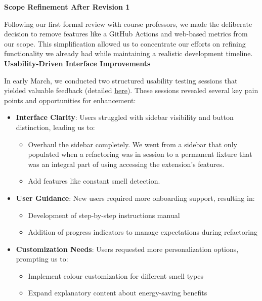 \documentclass{article}
\begin{document}
\noindent \textbf{Scope Refinement After Revision 1}

\noindent
Following our first formal review with course professors, we made the deliberate decision to remove features like a GitHub Actions and web-based metrics from our scope. This simplification allowed us to concentrate our efforts on refining functionality we already had while maintaining a realistic development timeline.\\


\noindent \textbf{Usability-Driven Interface Improvements}

\noindent
In early March, we conducted two structured usability testing sessions that yielded valuable feedback (detailed \href{https://github.com/ssm-lab/capstone--source-code-optimizer/blob/main/docs/Extras/UsabilityTesting/UsabilityTestingReport.pdf}{here}). These sessions revealed several key pain points and opportunities for enhancement:

\begin{itemize}
    \item \textbf{Interface Clarity}: Users struggled with sidebar visibility and button distinction, leading us to:
    \begin{itemize}
        \item Overhaul the sidebar completely. We went from a sidebar that only populated when a refactoring was in session to a permanent fixture that was an integral part of using accessing the extension's features.
        \item Add features like constant smell detection.
    \end{itemize}
    
    \item \textbf{User Guidance}: New users required more onboarding support, resulting in:
    \begin{itemize}
        \item Development of step-by-step instructions manual
        \item Addition of progress indicators to manage expectations during refactoring
    \end{itemize}
    
    \item \textbf{Customization Needs}: Users requested more personalization options, prompting us to:
    \begin{itemize}
        \item Implement colour customization for different smell types
        \item Expand explanatory content about energy-saving benefits
    \end{itemize}
\end{itemize}
\end{document}
